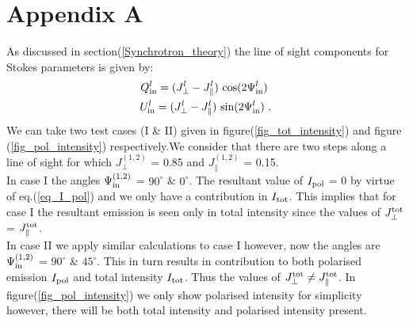 \documentclass[12pt, a4 paper]{article}
\begin{document}
\section{Appendix A}\label{Appendix_A}
As discussed in section(\ref{Synchrotron_theory}) the line of sight components for Stokes parameters is given by:
\begin{eqnarray}
Q^l_{\rm in} = ({J_{\perp}^l} - J_{\parallel}^l) \ {\cos}(2\Psi^l_{\rm in}) \ \\ U^l_{\rm in} = ({J_{\perp}^l} - J_{\parallel}^l) \ {\sin}(2\Psi^l_{\rm in}) \ .
\end{eqnarray}
We can take two test cases (I \& II) given in figure(\ref{fig_tot_intensity}) and figure (\ref{fig_pol_intensity}) respectively.We consider that there are two steps along a line of sight for which ${J_{\perp}^{(1,2)}}$ = 0.85 and $J_{\parallel}^{(1,2)}$  = 0.15. 
\\ In case I the angles $\Psi_{\rm in}^{(1,2)}$ = $90^{\circ}$ \& $0^{\circ}$. The resultant value of $I_{\rm pol}$ = 0 by virtue of eq.(\ref{eq_I_pol}) and we only have a contribution in $I_{\rm tot}$. This implies that for case I the resultant emission is seen only in total intensity since the values of $J_{\perp}^{\rm tot}$ = $J_{\parallel}^{\rm tot}$. 
\\ In case II we apply similar calculations to case I however, now the angles are $\Psi_{\rm in}^{(1,2)}$ = $90^{\circ}$ \& $45^{\circ}$. This in turn results in contribution to both polarised emission $I_{\rm pol}$ and total intensity $I_{\rm tot}$. Thus the values of $J_{\perp}^{\rm tot} \neq J_{\parallel}^{\rm tot}$. In figure(\ref{fig_pol_intensity}) we only show polarised intensity for simplicity however, there will be both total intensity and polarised intensity present.
\end{document}

